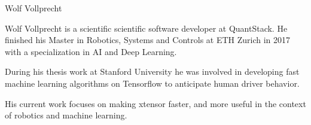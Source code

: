 \begin{participant}[type=R,PM=0,gender=male]{Wolf Vollprecht}


  \par Wolf Vollprecht is a scientific scientific software developer at QuantStack. He finished his Master in Robotics, Systems and Controls at ETH Zurich in 2017 with a specialization in AI and Deep Learning.

  \par During his thesis work at Stanford University he was involved in developing fast machine learning algorithms on Tensorflow to anticipate human driver behavior.

  \par His current work focuses on making xtensor faster, and more useful in the context of robotics and machine learning.

\end{participant}

